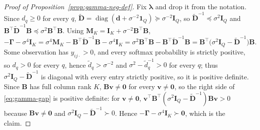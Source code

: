 \begin{proof}[Proof of Proposition~\ref{prop:gamma-neg-def}]
Fix $\bm{\lambda}$ and drop it from the notation. Since $d_{q}\geq0$ for every $q$, $\tilde{\mathbf{D}}=\operatorname{diag}(\mathbf{d}+\sigma^{-2}\mathbf{1}_{Q})\succeq\sigma^{-2}\mathbf{I}_{Q}$, so $\tilde{\mathbf{D}}^{-1}\preceq\sigma^{2}\mathbf{I}_{Q}$ and $\mathbf{B}^{\top}\tilde{\mathbf{D}}^{-1}\mathbf{B}\preceq\sigma^{2}\mathbf{B}^{\top}\mathbf{B}$. Using $\mathbf{M}_{K}=\mathbf{I}_{K}+\sigma^{-2}\mathbf{B}^{\top}\mathbf{B}$,
\begin{equation}
    -\bm{\Gamma}-\sigma^{4}\mathbf{I}_{K}=\sigma^{4}\mathbf{M}_{K}-\mathbf{B}^{\top}\tilde{\mathbf{D}}^{-1}\mathbf{B}-\sigma^{4}\mathbf{I}_{K}=\sigma^{2}\mathbf{B}^{\top}\mathbf{B}-\mathbf{B}^{\top}\tilde{\mathbf{D}}^{-1}\mathbf{B}=\mathbf{B}^{\top}\big(\sigma^{2}\mathbf{I}_{Q}-\tilde{\mathbf{D}}^{-1}\big)\mathbf{B}.
    \label{eq:gamma-gap}
\end{equation}
Some observation has $y_{ij\cdot}>0$, and every softmax probability is strictly positive, so $d_{q}>0$ for every $q$, hence $\tilde{d}_{q}>\sigma^{-2}$ and $\sigma^{2}-\tilde{d}_{q}^{-1}>0$ for every $q$; thus $\sigma^{2}\mathbf{I}_{Q}-\tilde{\mathbf{D}}^{-1}$ is diagonal with every entry strictly positive, so it is positive definite. Since $\mathbf{B}$ has full column rank $K$, $\mathbf{B}\mathbf{v}\neq\bm{0}$ for every $\mathbf{v}\neq\bm{0}$, so the right side of \eqref{eq:gamma-gap} is positive definite: for $\mathbf{v}\neq\bm{0}$, $\mathbf{v}^{\top}\mathbf{B}^{\top}(\sigma^{2}\mathbf{I}_{Q}-\tilde{\mathbf{D}}^{-1})\mathbf{B}\mathbf{v}>0$ because $\mathbf{B}\mathbf{v}\neq\bm{0}$ and $\sigma^{2}\mathbf{I}_{Q}-\tilde{\mathbf{D}}^{-1}\succ0$. Hence $-\bm{\Gamma}-\sigma^{4}\mathbf{I}_{K}\succ\bm{0}$, which is the claim.
\end{proof}

